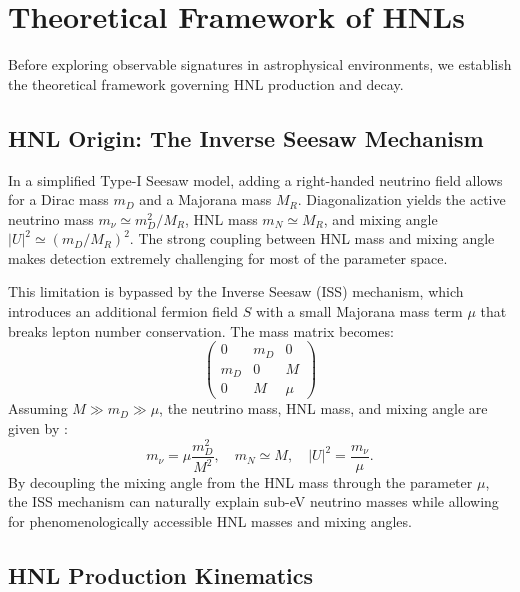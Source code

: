 \documentclass{article}
\begin{document}
\section{Theoretical Framework of HNLs} \label{sec:theory}

Before exploring observable signatures in astrophysical environments, we establish the theoretical framework governing HNL production and decay. 

\subsection{HNL Origin: The Inverse Seesaw Mechanism} \label{sec:iss}

In a simplified Type-I Seesaw model, adding a right-handed neutrino field allows for a Dirac mass $m_D$ and a Majorana mass $M_R$. Diagonalization yields the active neutrino mass $m_\nu \simeq m_D^2/M_R$, HNL mass $m_N \simeq M_R$, and mixing angle $|U|^2 \simeq (m_D/M_R)^2$. The strong coupling between HNL mass and mixing angle makes detection extremely challenging for most of the parameter space.

This limitation is bypassed by the Inverse Seesaw (ISS) mechanism, which introduces an additional fermion field $S$ with a small Majorana mass term $\mu$ that breaks lepton number conservation. The mass matrix becomes:
\begin{equation}
  \begin{pmatrix}
    0   & m_D & 0    \\
    m_D & 0   & M    \\
    0   & M   & \mu
  \end{pmatrix}
\end{equation}
Assuming $M \gg m_D \gg \mu$, the neutrino mass, HNL mass, and mixing angle are given by \cite{king2025righthandedneutrinosseesawmodels}:
\begin{equation}
  m_\nu = \mu \frac{m_D^2}{M^2}, \quad m_N \simeq M, \quad |U|^2 = \frac{m_\nu}{\mu}.
\end{equation}
By decoupling the mixing angle from the HNL mass through the parameter $\mu$, the ISS mechanism can naturally explain sub-eV neutrino masses while allowing for phenomenologically accessible HNL masses and mixing angles.

\subsection{HNL Production Kinematics} \label{sec:production}
\end{document}
